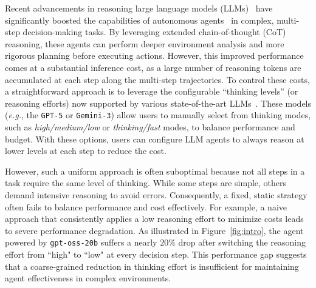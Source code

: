 \documentclass{article}
\theoremstyle{plain}
\theoremstyle{definition}
\theoremstyle{remark}
\begin{document}
Recent advancements in reasoning large language models (LLMs)~\citep{team2025kimi,guo2025deepseek,comanici2025gemini} have significantly boosted the capabilities of autonomous agents~\citep{jin2025search,sun2025scaling, liu2025learning,yang2025ultracua} in complex, multi-step decision-making tasks. By leveraging extended chain-of-thought (CoT) reasoning, these agents can perform deeper environment analysis and more rigorous planning before executing actions. However, this improved performance comes at a substantial inference cost, as a large number of reasoning tokens are accumulated at each step along the multi-step trajectories. To control these costs, a straightforward approach is to leverage the configurable ``thinking levels'' (or reasoning efforts) now supported by various state-of-the-art LLMs~\cite{singh2025openai}. These models (\emph{e.g.}, the \texttt{GPT-5} or \texttt{Gemini-3}) allow users to manually select from thinking modes, such as \textit{high/medium/low} or \textit{thinking/fast} modes, 
to balance performance and budget. With these options, users can configure LLM agents to always reason at lower levels at each step to reduce the cost.

However, such a uniform approach is often suboptimal because not all steps in a task require the same level of thinking. While some steps are simple, others demand intensive reasoning to avoid errors. Consequently, a fixed, static strategy often fails to balance performance and cost effectively. For example, a naive approach that consistently applies a low reasoning effort to minimize costs leads to severe performance degradation. As illustrated in Figure~\ref{fig:intro}, the agent powered by \texttt{gpt-oss-20b} suffers a nearly $20\%$ drop after switching the reasoning effort from ``high" to ``low" at every decision step. This performance gap suggests that a coarse-grained reduction in thinking effort is insufficient for maintaining agent effectiveness in complex environments.
\end{document}
